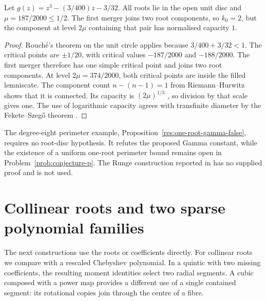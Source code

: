 \documentclass[11pt]{article}
\begin{document}
\begin{proposition}
\label{res:arity-not-capacity}
Let $g(z)=z^3-(3/400)z-3/32$. All roots lie in the open unit disc and
$\mu=187/2000\le1/2$. The first merger joins two root components, so
$k_0=2$, but the component at level $2\mu$ containing that pair has
normalised capacity $1$.
\end{proposition}
\begin{proof}
Rouch\'e's theorem on the unit circle applies because
$3/400+3/32<1$. The critical points are $\pm1/20$, with critical values
$-187/2000$ and $-188/2000$. The first merger therefore has one simple
critical point and joins two root components. At level
$2\mu=374/2000$, both critical points are inside the filled lemniscate.
The component count $n-(n-1)=1$ from Riemann--Hurwitz shows that it is
connected. Its capacity is $(2\mu)^{1/3}$
\cite[Theorem~5.2.5]{ransford1995}, so division by that scale gives one.
The use of logarithmic capacity agrees with transfinite diameter by the
Fekete--Szeg\H{o} theorem \cite[p.~153]{ransford1995}.
\end{proof}

The degree-eight perimeter example, Proposition~\ref{res:one-root-gamma-false},
requires no root-disc hypothesis. It refutes the proposed Gamma constant,
while the existence of a uniform one-root perimeter bound remains open
in Problem~\ref{prob:conjecture-p}. The Runge construction reported in
\cite[Proposition~2]{revision2026} has no supplied proof and is not used.

\section{Collinear roots and two sparse polynomial families}
\label{sec:solved-polynomial-families}

The next constructions use the roots or coefficients directly. For
collinear roots we compare with a rescaled Chebyshev polynomial. In a
quintic with two missing coefficients, the resulting moment identities
select two radial segments. A cubic composed with a power map provides
a different use of a single contained segment: its rotational copies
join through the centre of a fibre.
\end{document}
